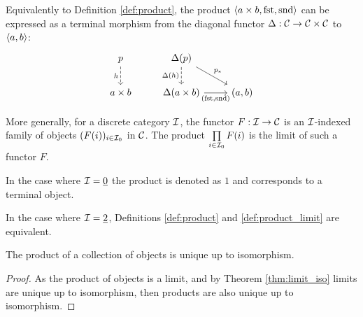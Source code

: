 \begin{definition}
	Equivalently to Definition \ref{def:product}, the product $\langle a\times b,
	\mathrm{fst}, \mathrm{snd}\rangle$ can be expressed as a terminal morphism from the diagonal functor $\Delta: \mathcal{C} \to \mathcal{C}\times \mathcal{C}$ to $\langle a, b\rangle$:
	\[\begin{tikzcd}[ampersand replacement=\&]
		p \& {\Delta(p)} \\
		{a\times b} \& {\Delta(a\times b)} \& {(a,b)}
		\arrow["h"', dashed, from=1-1, to=2-1]
		\arrow["{\Delta(h)}"', dashed, from=1-2, to=2-2]
		\arrow["{p_*}", from=1-2, to=2-3]
		\arrow["{(\mathrm{fst}, \mathrm{snd})}"', from=2-2, to=2-3]
	\end{tikzcd}\]

\end{definition}

\begin{definition}

	More generally, for a discrete category $\mathcal{I}$, the functor $F:\mathcal{I}\to \mathcal{C}$ is an
	$\mathcal{I}$-indexed family of objects $(F(i))_{i\in \mathcal{I}_0}$ in $\mathcal{C}$. The product
	$\prod\limits_{i\in \mathcal{I}_0} F(i)$ is the limit of such a functor $F$.
\end{definition}

\begin{remark}
	In the case where $\mathcal{I}=\underline{0}$ the product is denoted as $1$ and
	corresponds to a terminal object.
\end{remark}

\begin{remark}
	In the case where $\mathcal{I}=\underline{2}$, Definitions \ref{def:product} and
	\ref{def:product_limit} are equivalent.
\end{remark}

\begin{theorem}
	The product of a collection of objects is unique up to isomorphism.

	\begin{proof}
		As the product of objects is a limit, and by Theorem \ref{thm:limit_iso}
		limits are unique up to isomorphism, then products are also unique up to
		isomorphism.
	\end{proof}
\end{theorem}

